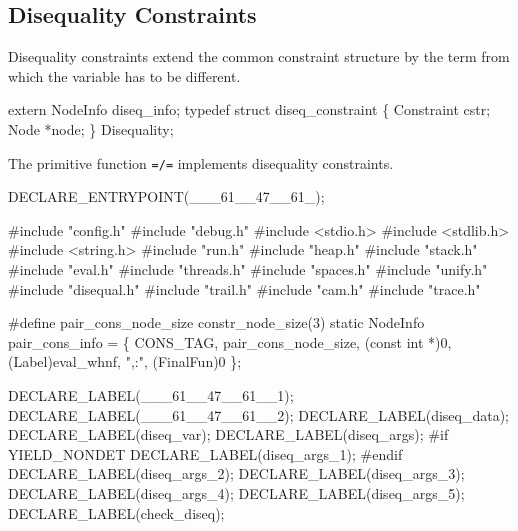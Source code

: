 %
%
\subsection{Disequality Constraints}
Disequality constraints extend the common constraint structure by the
term from which the variable has to be different.

\nwenddocs{}\endmoddef\nwstartdeflinemarkup{}\nwenddeflinemarkup
extern NodeInfo diseq_info;
typedef struct diseq_constraint \{
    Constraint cstr;
    Node       *node;
\} Disequality;

\nwendcode{}\nwdocspar
The primitive function \texttt{=/=} implements disequality constraints.

\nwenddocs{}\plusendmoddef\nwstartdeflinemarkup{}\nwenddeflinemarkup
DECLARE_ENTRYPOINT(___61__47__61_);

\nwendcode{}\nwdocspar
\nwenddocs{}\endmoddef\nwstartdeflinemarkup{}\nwenddeflinemarkup
#include "config.h"
#include "debug.h"
#include <stdio.h>
#include <stdlib.h>
#include <string.h>
#include "run.h"
#include "heap.h"
#include "stack.h"
#include "eval.h"
#include "threads.h"
#include "spaces.h"
#include "unify.h"
#include "disequal.h"
#include "trail.h"
#include "cam.h"
#include "trace.h"

#define pair_cons_node_size constr_node_size(3)
static
NodeInfo pair_cons_info = \{
    CONS_TAG, pair_cons_node_size, (const int *)0, (Label)eval_whnf, ",:", (FinalFun)0
\};

DECLARE_LABEL(___61__47__61__1);
DECLARE_LABEL(___61__47__61__2);
DECLARE_LABEL(diseq_data);
DECLARE_LABEL(diseq_var);
DECLARE_LABEL(diseq_args);
#if YIELD_NONDET
DECLARE_LABEL(diseq_args_1);
#endif
DECLARE_LABEL(diseq_args_2);
DECLARE_LABEL(diseq_args_3);
DECLARE_LABEL(diseq_args_4);
DECLARE_LABEL(diseq_args_5);
DECLARE_LABEL(check_diseq);

